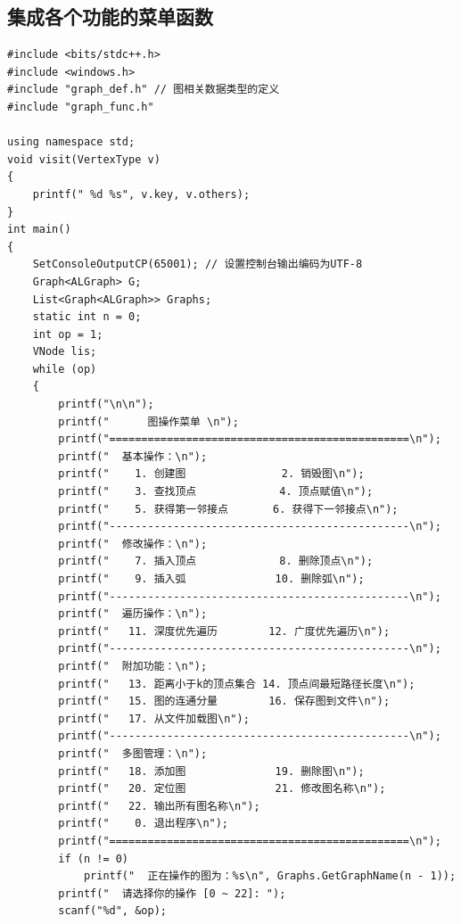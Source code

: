 \documentclass[supercite]{Experimental_Report}
\theoremstyle{definition}
\begin{document}
\subsection{集成各个功能的菜单函数}
\begin{lstlisting}
#include <bits/stdc++.h>
#include <windows.h>
#include "graph_def.h" // 图相关数据类型的定义
#include "graph_func.h"

using namespace std;
void visit(VertexType v)
{
    printf(" %d %s", v.key, v.others);
}
int main()
{
    SetConsoleOutputCP(65001); // 设置控制台输出编码为UTF-8
    Graph<ALGraph> G;
    List<Graph<ALGraph>> Graphs;
    static int n = 0;
    int op = 1;
    VNode lis;
    while (op)
    {
        printf("\n\n");
        printf("      图操作菜单 \n");
        printf("===============================================\n");
        printf("  基本操作：\n");
        printf("    1. 创建图               2. 销毁图\n");
        printf("    3. 查找顶点             4. 顶点赋值\n");
        printf("    5. 获得第一邻接点       6. 获得下一邻接点\n");
        printf("-----------------------------------------------\n");
        printf("  修改操作：\n");
        printf("    7. 插入顶点             8. 删除顶点\n");
        printf("    9. 插入弧              10. 删除弧\n");
        printf("-----------------------------------------------\n");
        printf("  遍历操作：\n");
        printf("   11. 深度优先遍历        12. 广度优先遍历\n");
        printf("-----------------------------------------------\n");
        printf("  附加功能：\n");
        printf("   13. 距离小于k的顶点集合 14. 顶点间最短路径长度\n");
        printf("   15. 图的连通分量        16. 保存图到文件\n");
        printf("   17. 从文件加载图\n");
        printf("-----------------------------------------------\n");
        printf("  多图管理：\n");
        printf("   18. 添加图              19. 删除图\n");
        printf("   20. 定位图              21. 修改图名称\n");
        printf("   22. 输出所有图名称\n");
        printf("    0. 退出程序\n");
        printf("===============================================\n");
        if (n != 0)
            printf("  正在操作的图为：%s\n", Graphs.GetGraphName(n - 1));
        printf("  请选择你的操作 [0 ~ 22]: ");
        scanf("%d", &op);


\end{lstlisting}
\end{document}
